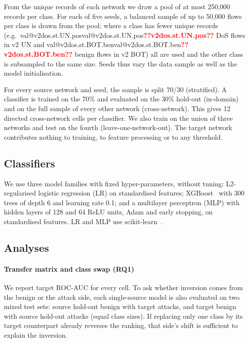 \documentclass[preprint,12pt]{elsarticle}
\makeatletter
\newcommand{\val}[1]{\ifcsname val@#1\endcsname\csname val@#1\endcsname\else\textbf{\textcolor{red}{??#1??}}\fi}
\newcommand{\net}[1]{\textsc{#1}}
\newcommand{\RQ}[1]{\textbf{RQ#1}}
\makeatother
\begin{document}
From the unique records of each network we draw a pool of at most 250{,}000 records per class. For each of five seeds, a balanced sample of up to 50{,}000 flows per class is drawn from the pool; where a class has fewer unique records (e.g.\ \val{v2dos.st.UN.pos} DoS flows in v2 \net{UN} and \val{v2dos.st.BOT.ben} benign flows in v2 \net{BOT}) all are used and the other class is subsampled to the same size. Seeds thus vary the data sample as well as the model initialisation.

For every source network and seed, the sample is split 70/30 (stratified). A classifier is trained on the 70\% and evaluated on the 30\% hold-out (in-domain) and on the full sample of every other network (cross-network). This gives 12 directed cross-network cells per classifier. We also train on the union of three networks and test on the fourth (leave-one-network-out). The target network contributes nothing to training, to feature processing or to any threshold.

\subsection{Classifiers}
\label{sec:clf}

We use three model families with fixed hyper-parameters, without tuning: L2-regularised logistic regression (LR) on standardised features; XGBoost~\cite{chen2016xgboost} with 300 trees of depth 6 and learning rate 0.1; and a multilayer perceptron (MLP) with hidden layers of 128 and 64 ReLU units, Adam and early stopping, on standardised features. LR and MLP use scikit-learn~\cite{pedregosa2011scikit}.

\subsection{Analyses}
\label{sec:analyses}

\paragraph{Transfer matrix and class swap (\RQ{1})}
We report target ROC-AUC for every cell. To ask whether inversion comes from the benign or the attack side, each single-source model is also evaluated on two mixed test sets: source hold-out benign with target attacks, and target benign with source hold-out attacks (equal class sizes). If replacing only one class by its target counterpart already reverses the ranking, that side's shift is sufficient to explain the inversion.
\end{document}
